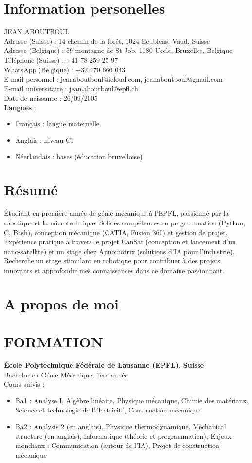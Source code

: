 \documentclass{article}
\begin{document}
\section{Information personelles}
JEAN ABOUTBOUL\\
Adresse (Suisse) : 14 chemin de la forêt, 1024 Ecublens, Vaud, Suisse\\
Adresse (Belgique) : 59 montagne de St Job, 1180 Uccle, Bruxelles, Belgique\\
Téléphone (Suisse) : +41 78 259 25 97\\
WhatsApp (Belgique) : +32 470 666 043\\
E-mail personnel : jeanaboutboul@icloud.com, jeanaboutboul@gmail.com\\
E-mail universitaire : jean.aboutboul@epfl.ch\\
Date de naissance : 26/09/2005\\
\textbf{Langues}  :
\begin{itemize}
\item Français : langue maternelle
\item Anglais : niveau C1
\item Néerlandais : bases (éducation bruxelloise)
\end{itemize}
\section{Résumé}
Étudiant en première année de génie mécanique à l'EPFL, passionné par la robotique et la microtechnique. 
Solides compétences en programmation (Python, C, Bash), conception mécanique (CATIA, Fusion 360) et gestion de projet.
Expérience pratique à travers le projet CanSat (conception et lancement d'un nano-satellite) et un stage chez Ajinomotrix (solutions d'IA pour l'industrie).
Recherche un stage stimulant en robotique pour contribuer à des projets innovants et approfondir mes connaissances dans ce domaine passionnant.
\section{A propos de moi}

\section{FORMATION}
\textbf{École Polytechnique Fédérale de Lausanne (EPFL), Suisse}\\
Bachelor en Génie Mécanique, 1ère année\\
Cours suivis :
\begin{itemize}
\item Ba1 : Analyse I, Algèbre linéaire, Physique mécanique, Chimie des matériaux, Science et technologie de l'électricité, Construction mécanique
\item Ba2 : Analysis 2 (en anglais), Physique thermodynamique, Mechanical structure (en anglais), Informatique (théorie et programmation), Enjeux mondiaux : Communication (autour de l'IA), Projet de construction mécanique
\end{itemize}
\end{document}
